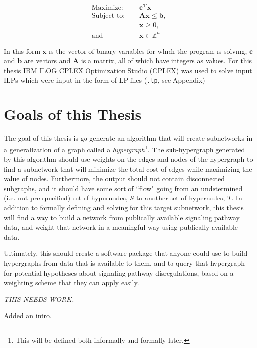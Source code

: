 \documentclass[12pt,twoside]{reedthesis}
\theoremstyle{definition}
\begin{document}
{  \begin{align}
    \text{Maximize: }\quad&\mathbf{c^Tx}\label{eq:obj_canonical}\\
    \text{Subject to: }\quad&\mathbf{Ax}\leq\mathbf{b}\text{,}\label{eq:constA}\\
    &\mathbf{x} \geq 0 \text{,}\label{eq:constB}\\
    \text{and } \quad & \mathbf{x} \in \mathbb{Z}^n \label{eq:constC}
  \end{align}

  In this form $\mathbf{x}$ is the vector of binary variables for which the program is solving, $\mathbf{c}$ and $\mathbf{b}$ are vectors and $\mathbf{A}$ is a matrix, all of which have integers as values. For this thesis IBM ILOG CPLEX Optimization Studio (CPLEX) was used to solve input ILPs which were input in the form of LP files (\texttt{.lp}, see Appendix)

 \section{Goals of this Thesis}

 The goal of this thesis is go generate an algorithm that will create subnetworks in a generalization of a graph called a \textit{hypergraph}\footnote{This will be defined both informally and formally later.}. The sub-hypergraph generated by this algorithm should use weights on the edges and nodes of the hypergraph to find a subnetwork that will minimize the total cost of edges while maximizing the value of nodes. Furthermore, the output should not contain disconnected subgraphs, and it should have some sort of ``flow" going from an undetermined (i.e. not pre-specified) set of hypernodes, $S$ to another set of hypernodes, $T$. In addition to formally defining and solving for this target subnetwork, this thesis will find a way to build a network from publically available signaling pathway data, and weight that network in a meaningful way using publically available data.\par

 Ultimately, this should create a software package that anyone could use to build hypergraphs from data that is available to them, and to query that hypergraph for potential hypotheses about signaling pathway disregulations, based on a weighting scheme that they can apply easily.\par

 \emph{THIS NEEDS WORK.}

 }{Added an intro.}
\end{document}
